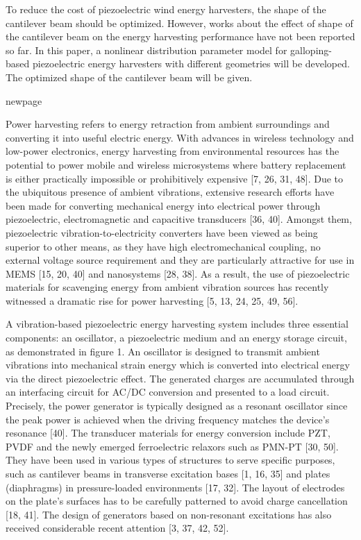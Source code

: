 \documentclass{article}
\begin{document}
To reduce the cost of piezoelectric wind energy harvesters, the shape of the cantilever beam should be optimized. However, works about the effect of shape of the cantilever beam on the energy harvesting performance
have not been reported so far. In this paper, a nonlinear distribution parameter model for galloping-based piezoelectric energy harvesters with different geometries will be developed. The optimized shape of the cantilever
beam will be given.








\newpage
newpage
\newpage



Power harvesting refers to energy retraction from ambient
surroundings and converting it into useful electric energy. With
advances in wireless technology and low-power electronics,
energy harvesting from environmental resources has the
potential to power mobile and wireless microsystems where
battery replacement is either practically impossible or
prohibitively expensive [7, 26, 31, 48]. Due to the ubiquitous
presence of ambient vibrations, extensive research efforts
have been made for converting mechanical energy into
electrical power through piezoelectric, electromagnetic and
capacitive transducers [36, 40]. Amongst them, piezoelectric
vibration-to-electricity converters have been viewed as being
superior to other means, as they have high electromechanical
coupling, no external voltage source requirement and they
are particularly attractive for use in MEMS [15, 20, 40] and
nanosystems [28, 38]. As a result, the use of piezoelectric
materials for scavenging energy from ambient vibration
sources has recently witnessed a dramatic rise for power
harvesting [5, 13, 24, 25, 49, 56].

A vibration-based piezoelectric energy harvesting system
includes three essential components: an oscillator, a
piezoelectric medium and an energy storage circuit, as
demonstrated in figure 1. An oscillator is designed to transmit
ambient vibrations into mechanical strain energy which is
converted into electrical energy via the direct piezoelectric
effect. The generated charges are accumulated through an
interfacing circuit for AC/DC conversion and presented to
a load circuit. Precisely, the power generator is typically
designed as a resonant oscillator since the peak power is
achieved when the driving frequency matches the device’s
resonance [40]. The transducer materials for energy conversion
include PZT, PVDF and the newly emerged ferroelectric
relaxors such as PMN-PT [30, 50]. They have been used in
various types of structures to serve specific purposes, such as
cantilever beams in transverse excitation bases [1, 16, 35] and
plates (diaphragms) in pressure-loaded environments [17, 32].
The layout of electrodes on the plate’s surfaces has to be
carefully patterned to avoid charge cancellation [18, 41]. The
design of generators based on non-resonant excitations has also
received considerable recent attention [3, 37, 42, 52].
\end{document}
